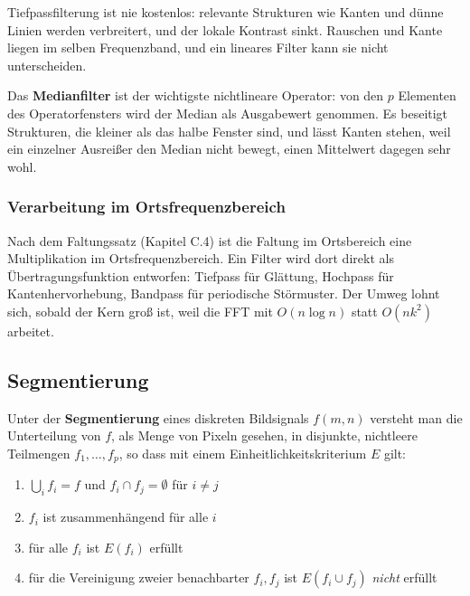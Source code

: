\documentclass[12pt, a4paper]{article}
\begin{document}
\begin{notebox}
Tiefpassfilterung ist nie kostenlos: relevante Strukturen wie Kanten und dünne Linien
werden verbreitert, und der lokale Kontrast sinkt. Rauschen und Kante liegen im selben
Frequenzband, und ein lineares Filter kann sie nicht unterscheiden.
\end{notebox}

Das \textbf{Medianfilter} ist der wichtigste nichtlineare Operator: von den $p$
Elementen des Operatorfensters wird der Median als Ausgabewert genommen. Es beseitigt
Strukturen, die kleiner als das halbe Fenster sind, und lässt Kanten stehen, weil ein
einzelner Ausreißer den Median nicht bewegt, einen Mittelwert dagegen sehr wohl.

\subsubsection*{Verarbeitung im Ortsfrequenzbereich}

Nach dem Faltungssatz (Kapitel C.4) ist die Faltung im Ortsbereich eine Multiplikation
im Ortsfrequenzbereich. Ein Filter wird dort direkt als Übertragungsfunktion
entworfen: Tiefpass für Glättung, Hochpass für Kantenhervorhebung, Bandpass für
periodische Störmuster. Der Umweg lohnt sich, sobald der Kern groß ist, weil die FFT
mit $O(n \log n)$ statt $O(n k^{2})$ arbeitet.

\subsection{Segmentierung}

\begin{definitionbox}
Unter der \textbf{Segmentierung} eines diskreten Bildsignals $f(m,n)$ versteht man die
Unterteilung von $f$, als Menge von Pixeln gesehen, in disjunkte, nichtleere Teilmengen
$f_1, \ldots, f_p$, so dass mit einem Einheitlichkeitskriterium $E$ gilt:
\begin{enumerate}[label=\alph*)]
  \item $\bigcup_{i} f_i = f$ und $f_i \cap f_j = \emptyset$ für $i \neq j$
  \item $f_i$ ist zusammenhängend für alle $i$
  \item für alle $f_i$ ist $E(f_i)$ erfüllt
  \item für die Vereinigung zweier benachbarter $f_i, f_j$ ist $E(f_i \cup f_j)$
        \textit{nicht} erfüllt
\end{enumerate}
\end{definitionbox}
\end{document}
